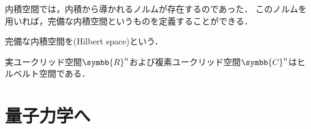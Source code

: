 \documentclass{sotsu}
\newif\ifdraft
\begin{document}
内積空間では，内積から導かれるノルムが存在するのであった．
このノルムを用いれば，完備な内積空間というものを定義することができる．

\begin{definition}[ヒルベルト空間]
    \label{dfn:Hilbert-space}
    完備な内積空間を(Hilbert space)という．
\end{definition}

\begin{proposition}
    実ユークリッド空間$\symbb{R}^n$および複素ユークリッド空間$\symbb{C}^n$はヒルベルト空間である．
\end{proposition}















\chapter{量子力学へ}







\printbibheading

\printbibliography[
    keyword=set,
    heading=subbibliography,
    title={集合論}
]
\printbibliography[
    keyword=lin, 
    heading=subbibliography, 
    title={線形代数}
]




\ifdraft
\else
    \printindex
\fi
\end{document}
